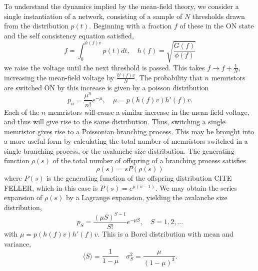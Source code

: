 \documentclass[aps,prl,reprint,groupedaddress]{revtex4-1}
\begin{document}
To understand the dynamics implied by the mean-field theory, we consider a single instantiation of
a network, consisting of a sample of $N$ thresholds drawn from the distribution $p(t)$. Beginning
with a fraction $f$ of these in the ON state and the self consistency equation satisfied,
\[ f = \int_0^{h(f) v} p(t) dt,\quad h(f) = \sqrt{\frac{G(f)}{\phi(f)}}\]
we raise the voltage until the next threshold is passed.  This takes $f\to f+\frac{1}{N}$, increasing 
the mean-field voltage by $\frac{h'(f)v}{N}$. The probability that $n$ memristors are switched ON
 by this increase is given by a poisson distribution
\[p_n = \frac{\mu^n}{n!} e^{-\mu}, \quad \mu = p(h(f)v) h'(f)v.\]
Each of the $n$ memristors will cause a similar increase in the mean-field voltage, and thus will give rise to the same distribution.  Thus, switching a single memristor gives rise to a Poissonian
branching process.  This may be brought into a more useful form by calculating the total number of
memristors switched in a single branching process, or the avalanche size distribution.  The
generating function $\rho(s)$ of the total number of offspring of a branching process satisfies
\[\rho(s) = sP(\rho(s))\]
where $P(s)$ is the generating function of the offspring distribution CITE FELLER, which in this case is $P(s) = e^{\mu(s-1)}$. We may obtain the series expansion of $\rho(s)$ by a Lagrange expansion,
yielding the avalanche size distribution,
\[p_S = \frac{(\mu S)^{S-1}}{S!} e^{-\mu S}, \quad S=1, 2, ...\]
with $\mu= p(h(f)v) h'(f)v$. This is a Borel distribution with mean and variance,
\[\langle S \rangle = \frac{1}{1-\mu}\quad \sigma_S^2 = \frac{\mu}{(1-\mu)^3}.\]



%
\end{document}
